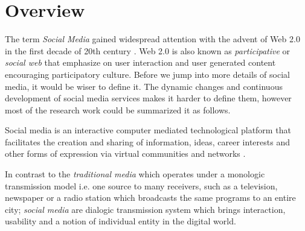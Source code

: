 \section*{Overview}
\label{sec:overview}
The term {\em Social Media} gained widespread attention with the advent of Web 2.0 in the first decade of 20th century \cite{kaplan2010users}. Web 2.0 is also known as {\em participative} or {\em social web} that emphasize on user interaction and user generated content encouraging participatory culture. Before we jump into more details of social media, it would be wiser to define it.
The dynamic changes and continuous development of social media services makes it harder to define them, however most of the research work could be summarized it as follows.

\begin{definition}
Social media is an interactive computer mediated technological platform that facilitates the creation and sharing of information, ideas, career interests and other forms of expression via virtual communities and networks \cite{kietzmann2011social}.
\end{definition}

In contrast to the {\em traditional media} which operates under a monologic transmission model i.e. one source to many receivers, such as a television, newspaper  or a radio station which broadcasts the same programs to an entire city; {\em social media} are dialogic transmission system which brings interaction, usability and a notion of individual entity in the digital world.




